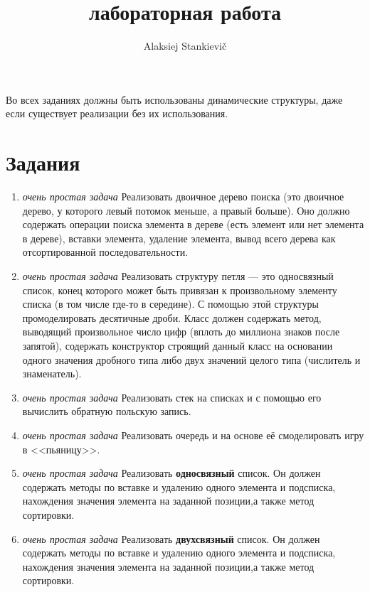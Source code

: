 \documentclass[12pt]{article}
\author{Alaksiej Stankievič}
\title{лабораторная работа}
\begin{document}

Во всех заданиях должны быть использованы динамические структуры, даже если существует реализации без их использования.

\section*{Задания}

\begin{enumerate}
 
 \item \emph{очень простая задача} Реализовать двоичное дерево поиска (это двоичное дерево, у которого левый потомок 
 меньше, а правый больше). Оно должно содержать операции поиска  элемента в дереве (есть элемент или нет элемента в 
 дереве), вставки элемента, удаление элемента, вывод всего дерева как отсортированной последовательности.
 \item \emph{очень простая задача} Реализовать структуру петля --- это односвязный список, конец которого может быть
 привязан  к произвольному элементу списка (в том числе где-то в середине). С помощью этой структуры промоделировать 
 десятичные дроби. Класс должен содержать метод, выводящий произвольное число цифр (вплоть до миллиона знаков после 
 запятой), содержать конструктор строящий данный класс на основании одного значения дробного типа либо двух значений 
 целого типа (числитель и знаменатель).
 \item \emph{очень простая задача} Реализовать стек на списках и с помощью его вычислить обратную польскую запись.
 \item \emph{очень простая задача} Реализовать очередь и на основе её смоделировать игру в <<пьяницу>>.
 \item \emph{очень простая задача} Реализовать \textbf{односвязный} список. Он должен содержать методы по вставке и 
 удалению одного элемента и подсписка, нахождения значения элемента на  заданной позиции,а также метод сортировки.
 \item \emph{очень простая задача} Реализовать \textbf{двухсвязный} список. Он должен содержать методы по вставке и 
 удалению одного элемента и подсписка, нахождения значения элемента на  заданной позиции,а также метод сортировки.
 

\end{enumerate}
\end{document}
